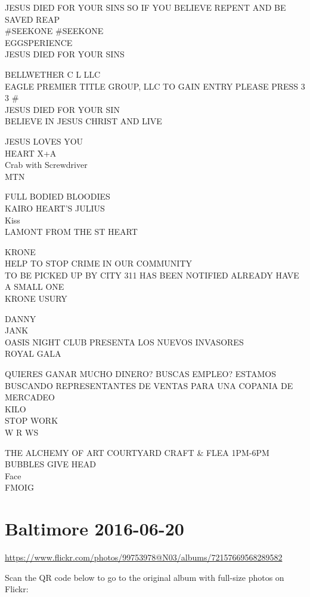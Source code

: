 \documentclass[10pt,letterpaper]{article}
\begin{document}
JESUS DIED FOR YOUR SINS SO IF YOU BELIEVE REPENT AND BE SAVED REAP\\
\#SEEKONE \#SEEKONE\\
EGGSPERIENCE\\
JESUS DIED FOR YOUR SINS

BELLWETHER C L LLC\\
EAGLE PREMIER TITLE GROUP, LLC TO GAIN ENTRY PLEASE PRESS 3 3 \#\\
JESUS DIED FOR YOUR SIN\\
BELIEVE IN JESUS CHRIST AND LIVE

JESUS LOVES YOU\\
HEART X+A\\
Crab with Screwdriver\\
MTN

FULL BODIED BLOODIES\\
KAIRO HEART'S JULIUS\\
Kiss\\
LAMONT FROM THE ST HEART

KRONE\\
HELP TO STOP CRIME IN OUR COMMUNITY\\
TO BE PICKED UP BY CITY 311 HAS BEEN NOTIFIED ALREADY HAVE A SMALL ONE\\
KRONE USURY

DANNY\\
JANK\\
OASIS NIGHT CLUB PRESENTA LOS NUEVOS INVASORES\\
ROYAL GALA

QUIERES GANAR MUCHO DINERO?  BUSCAS EMPLEO?  ESTAMOS BUSCANDO REPRESENTANTES DE VENTAS PARA UNA COPANIA DE MERCADEO\\
KILO\\
STOP WORK\\
W R WS

THE ALCHEMY OF ART COURTYARD CRAFT \& FLEA 1PM{-}6PM\\
BUBBLES GIVE HEAD\\
Face\\
FMOIG


\section*{Baltimore 2016-06-20}

\url{https://www.flickr.com/photos/99753978@N03/albums/72157669568289582}

Scan the QR code below to go to the original album with full-size photos on Flickr:
\end{document}
